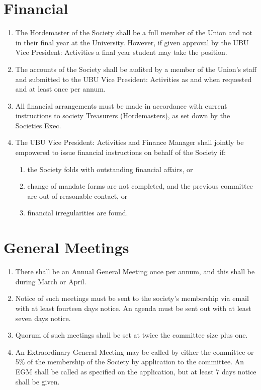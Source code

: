 \documentclass[a4paper,10pt]{article}
\begin{document}
\section{Financial}
\begin{enumerate}
  \item The Hordemaster of the Society shall be a full member of the Union and not in their final year at the University. However, if given approval by the UBU Vice President: Activities a final year student may take the position.
  \item The accounts of the Society shall be audited by a member of the Union's staff and submitted to the UBU Vice President: Activities as and when requested and at least once per annum.
  \item All financial arrangements must be made in accordance with current instructions to society Treasurers (Hordemasters), as set down by the Societies Exec.
  \item The UBU Vice President: Activities and Finance Manager shall jointly be empowered to issue financial instructions on behalf of the Society if:
  \begin{enumerate}
    \item the Society folds with outstanding financial affairs, or
    \item change of mandate forms are not completed, and the previous committee are out of reasonable contact, or
    \item financial irregularities are found.
  \end{enumerate}
\end{enumerate}

\section{General Meetings}
\begin{enumerate}
  \item There shall be an Annual General Meeting once per annum, and this shall be during March or April.
  \item Notice of such meetings must be sent to the society's membership via email with at least fourteen days notice. An agenda must be sent out with at least seven days notice.
  \item Quorum of such meetings shall be set at twice the committee size plus one.
  \item An Extraordinary General Meeting may be called by either the committee or 5\% of the membership of the Society by application to the committee. An EGM shall be called as specified on the application, but at least 7 days notice shall be given.
\end{enumerate}
\end{document}
